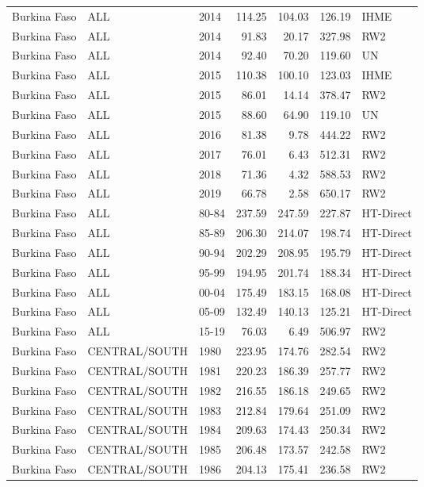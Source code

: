 \begin{longtable}{lllrrrl}
  Burkina Faso & ALL & 2014 & 114.25 & 104.03 & 126.19 & IHME \\ 
  Burkina Faso & ALL & 2014 & 91.83 & 20.17 & 327.98 & RW2 \\ 
  Burkina Faso & ALL & 2014 & 92.40 & 70.20 & 119.60 & UN \\ 
  Burkina Faso & ALL & 2015 & 110.38 & 100.10 & 123.03 & IHME \\ 
  Burkina Faso & ALL & 2015 & 86.01 & 14.14 & 378.47 & RW2 \\ 
  Burkina Faso & ALL & 2015 & 88.60 & 64.90 & 119.10 & UN \\ 
  Burkina Faso & ALL & 2016 & 81.38 & 9.78 & 444.22 & RW2 \\ 
  Burkina Faso & ALL & 2017 & 76.01 & 6.43 & 512.31 & RW2 \\ 
  Burkina Faso & ALL & 2018 & 71.36 & 4.32 & 588.53 & RW2 \\ 
  Burkina Faso & ALL & 2019 & 66.78 & 2.58 & 650.17 & RW2 \\ 
  Burkina Faso & ALL & 80-84 & 237.59 & 247.59 & 227.87 & HT-Direct \\ 
  Burkina Faso & ALL & 85-89 & 206.30 & 214.07 & 198.74 & HT-Direct \\ 
  Burkina Faso & ALL & 90-94 & 202.29 & 208.95 & 195.79 & HT-Direct \\ 
  Burkina Faso & ALL & 95-99 & 194.95 & 201.74 & 188.34 & HT-Direct \\ 
  Burkina Faso & ALL & 00-04 & 175.49 & 183.15 & 168.08 & HT-Direct \\ 
  Burkina Faso & ALL & 05-09 & 132.49 & 140.13 & 125.21 & HT-Direct \\ 
  Burkina Faso & ALL & 15-19 & 76.03 & 6.49 & 506.97 & RW2 \\ 
  Burkina Faso & CENTRAL/SOUTH & 1980 & 223.95 & 174.76 & 282.54 & RW2 \\ 
  Burkina Faso & CENTRAL/SOUTH & 1981 & 220.23 & 186.39 & 257.77 & RW2 \\ 
  Burkina Faso & CENTRAL/SOUTH & 1982 & 216.55 & 186.18 & 249.65 & RW2 \\ 
  Burkina Faso & CENTRAL/SOUTH & 1983 & 212.84 & 179.64 & 251.09 & RW2 \\ 
  Burkina Faso & CENTRAL/SOUTH & 1984 & 209.63 & 174.43 & 250.34 & RW2 \\ 
  Burkina Faso & CENTRAL/SOUTH & 1985 & 206.48 & 173.57 & 242.58 & RW2 \\ 
  Burkina Faso & CENTRAL/SOUTH & 1986 & 204.13 & 175.41 & 236.58 & RW2 \\ 

\end{longtable}
